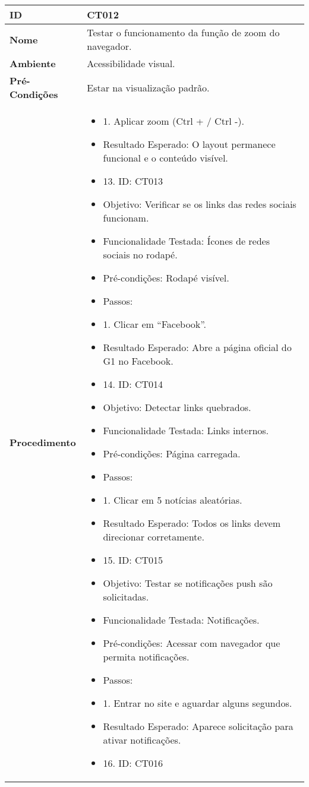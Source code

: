 \documentclass[12pt]{article}
\begin{document}
\renewcommand{\arraystretch}{1.5}
\begin{tabular}{|>{\bfseries}p{4cm}|p{10cm}|}
    \hline
    ID & CT012 \\
    \hline
    Nome & Testar o funcionamento da função de zoom do navegador. \\
    \hline
    Ambiente & Acessibilidade visual. \\
    \hline
    Pré-Condições & Estar na visualização padrão. \\
    \hline
    Procedimento & 
    \begin{itemize}
\item 1. Aplicar zoom (Ctrl + / Ctrl -).
\item Resultado Esperado: O layout permanece funcional e o conteúdo visível.
\item 13. ID: CT013
\item Objetivo: Verificar se os links das redes sociais funcionam.
\item Funcionalidade Testada: Ícones de redes sociais no rodapé.
\item Pré-condições: Rodapé visível.
\item Passos:
\item 1. Clicar em “Facebook”.
\item Resultado Esperado: Abre a página oficial do G1 no Facebook.
\item 14. ID: CT014
\item Objetivo: Detectar links quebrados.
\item Funcionalidade Testada: Links internos.
\item Pré-condições: Página carregada.
\item Passos:
\item 1. Clicar em 5 notícias aleatórias.
\item Resultado Esperado: Todos os links devem direcionar corretamente.
\item 15. ID: CT015
\item Objetivo: Testar se notificações push são solicitadas.
\item Funcionalidade Testada: Notificações.
\item Pré-condições: Acessar com navegador que permita notificações.
\item Passos:
\item 1. Entrar no site e aguardar alguns segundos.
\item Resultado Esperado: Aparece solicitação para ativar notificações.
\item 16. ID: CT016

\end{itemize}
\end{tabular}
\end{document}
